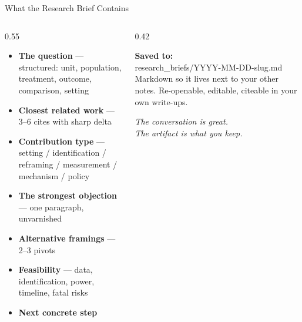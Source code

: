 \documentclass[aspectratio=169, 10pt]{beamer}
\begin{document}
{
\begin{frame}
\end{frame}
}

\begin{frame}{What the Research Brief Contains}
\begin{columns}[T]
\begin{column}{0.55\textwidth}
\begin{tcolorbox}[keybox, title={\faFile\quad Brief sections}, width=\textwidth]
\scriptsize
\begin{itemize}\setlength{\itemsep}{1pt}
  \item \textbf{The question} --- structured: unit, population, treatment, outcome, comparison, setting
  \item \textbf{Closest related work} --- 3--6 cites with sharp delta
  \item \textbf{Contribution type} --- setting / identification / reframing / measurement / mechanism / policy
  \item \textbf{The strongest objection} --- one paragraph, unvarnished
  \item \textbf{Alternative framings} --- 2--3 pivots
  \item \textbf{Feasibility} --- data, identification, power, timeline, fatal risks
  \item \textbf{Next concrete step}
\end{itemize}
\end{tcolorbox}
\end{column}
\begin{column}{0.42\textwidth}
\vskip2pt
\begin{tcolorbox}[accentbox]
\scriptsize
\textbf{Saved to:}\\
{\tiny\ttfamily research\_briefs/YYYY-MM-DD-{slug}.md}
\vskip4pt
Markdown so it lives next to your other notes. Re-openable, editable, citeable in your own write-ups.
\end{tcolorbox}
\vskip6pt
\pause
\begin{tcolorbox}[quotebox]
\scriptsize \textit{The conversation is great.\\ The artifact is what you keep.}
\end{tcolorbox}
\end{column}
\end{columns}
\end{frame}
\end{document}
